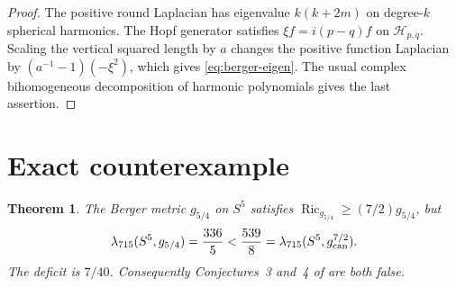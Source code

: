 \documentclass[10pt]{article}
\newtheorem{theorem}{Theorem}
\newcommand{\Ric}{\operatorname{Ric}}
\begin{document}
\begin{proof}
The positive round Laplacian has eigenvalue $k(k+2m)$ on degree-$k$
spherical harmonics.  The Hopf generator satisfies
$\xi f=i(p-q)f$ on $\mathcal H_{p,q}$.  Scaling the vertical squared length by
$a$ changes the positive function Laplacian by
$(a^{-1}-1)(-\xi^2)$, which gives \eqref{eq:berger-eigen}.  The usual complex
bihomogeneous decomposition of harmonic polynomials gives the last assertion.
\end{proof}

\section{Exact counterexample}
\begin{theorem}\label{thm:main}
The Berger metric $g_{5/4}$ on $S^5$ satisfies
$\Ric_{g_{5/4}}\geq(7/2)g_{5/4}$, but
\[
 \lambda_{715}(S^5,g_{5/4})=\frac{336}{5}
 <\frac{539}{8}
 =\lambda_{715}(S^5,g_{\rm can}^{7/2}).
\]
The deficit is $7/40$.  Consequently Conjectures~3 and~4 of \cite{Milman}
are both false.
\end{theorem}
\end{document}
